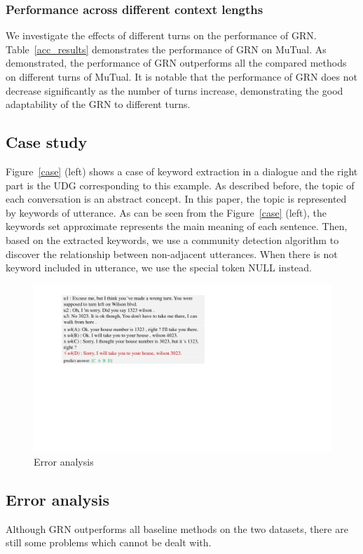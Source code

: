 \documentclass[letterpaper]{article}
\begin{document}
\subsubsection{Performance across different context lengths}
We investigate the effects of different turns on the performance of GRN. Table~\ref{acc_results} demonstrates the performance of GRN on MuTual. As demonstrated, the performance of GRN outperforms all the compared methods on different turns of MuTual. It is notable that the performance of GRN does not decrease significantly as the number of turns increase, demonstrating the good adaptability of the GRN to different turns.
\subsection{Case study}
Figure~\ref{case} (left) shows a case of keyword extraction in a dialogue and the right part is the UDG corresponding to this example. As described before, the topic of each conversation is an abstract concept. In this paper, the topic is represented by keywords of utterance. As can be seen from the Figure~\ref{case} (left), the keywords set approximate represents the main meaning of each sentence. Then, based on the extracted keywords, we use a community detection algorithm to discover the relationship between non-adjacent utterances. When there is not keyword included in utterance, we use the special token NULL instead.
\begin{figure}[t]
\centering
\includegraphics[width=1\columnwidth]{error}
\caption{Error analysis}
\label{error}
\end{figure}
\subsection{Error analysis}
Although GRN outperforms all baseline methods on the two datasets, there are still some problems which cannot be dealt with.
\end{document}
